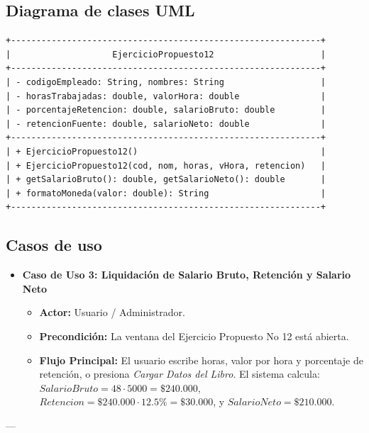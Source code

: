 \documentclass[11pt,a4paper]{article}
\begin{document}
\subsection{Diagrama de clases UML}
\begin{tcolorbox}[colframe=blue!60!black,colback=blue!5!white,arc=4mm,title=\textbf{namespace Actividad1.EjercicioPropuesto12}]
\centering
\begin{verbatim}
+-------------------------------------------------------------+
|                    EjercicioPropuesto12                     |
+-------------------------------------------------------------+
| - codigoEmpleado: String, nombres: String                   |
| - horasTrabajadas: double, valorHora: double                |
| - porcentajeRetencion: double, salarioBruto: double         |
| - retencionFuente: double, salarioNeto: double              |
+-------------------------------------------------------------+
| + EjercicioPropuesto12()                                    |
| + EjercicioPropuesto12(cod, nom, horas, vHora, retencion)   |
| + getSalarioBruto(): double, getSalarioNeto(): double       |
| + formatoMoneda(valor: double): String                      |
+-------------------------------------------------------------+
\end{verbatim}
\end{tcolorbox}

\subsection{Casos de uso}
\begin{itemize}[leftmargin=*]
    \item \textbf{Caso de Uso 3: Liquidación de Salario Bruto, Retención y Salario Neto}
    \begin{itemize}
        \item \textbf{Actor:} Usuario / Administrador.
        \item \textbf{Precondición:} La ventana del Ejercicio Propuesto No 12 está abierta.
        \item \textbf{Flujo Principal:} El usuario escribe horas, valor por hora y porcentaje de retención, o presiona \textit{Cargar Datos del Libro}. El sistema calcula: $SalarioBruto = 48 \cdot 5000 = \$240.000$, $Retencion = \$240.000 \cdot 12.5\% = \$30.000$, y $SalarioNeto = \$210.000$.
    \end{itemize}
\end{itemize}

---
\end{document}
